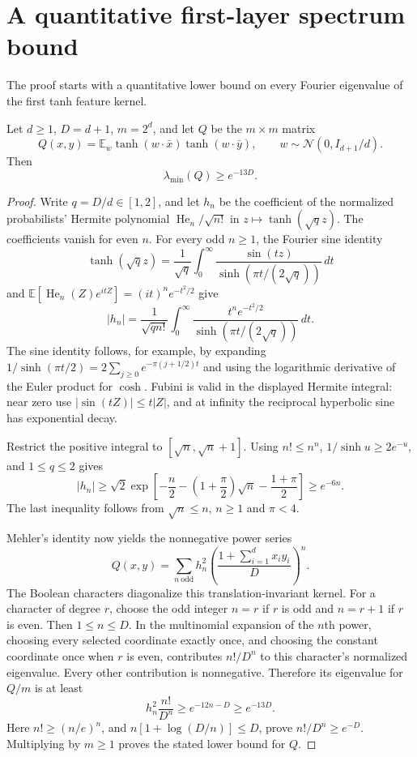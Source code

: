 \section{A quantitative first-layer spectrum bound}
\label{sec:critical-first-spectrum}

The proof starts with a quantitative lower bound on every Fourier
eigenvalue of the first tanh feature kernel.

\begin{lemma}
\label{lem:first-tanh-spectrum}
Let $d\ge1$, $D=d+1$, $m=2^d$, and let $Q$ be the $m\times m$ matrix
\[
 Q(x,y)=\mathbb E_w\tanh(w\cdot\bar x)\tanh(w\cdot\bar y),
 \qquad w\sim\mathcal N(0,I_{d+1}/d).
\]
Then
\[
 \lambda_{\min}(Q)\ge e^{-13D}.
\]
\end{lemma}

\begin{proof}
Write $q=D/d\in[1,2]$, and let $h_n$ be the coefficient of the
normalized probabilists' Hermite polynomial $\operatorname{He}_n/\sqrt{n!}$
in $z\mapsto\tanh(\sqrt q z)$. The coefficients vanish for even $n$.
For every odd $n\ge1$, the Fourier sine identity
\[
 \tanh(\sqrt q z)=\frac1{\sqrt q}\int_0^\infty
       \frac{\sin(tz)}{\sinh(\pi t/(2\sqrt q))}\,dt
\]
and $\mathbb E[\operatorname{He}_n(Z)e^{itZ}]=(it)^ne^{-t^2/2}$ give
\[
 |h_n|=\frac1{\sqrt{q n!}}\int_0^\infty
       \frac{t^ne^{-t^2/2}}{\sinh(\pi t/(2\sqrt q))}\,dt.
\]
The sine identity follows, for example, by expanding
$1/\sinh(\pi t/2)=2\sum_{j\ge0}e^{-\pi(j+1/2)t}$ and using the
logarithmic derivative of the Euler product for $\cosh$.
Fubini is valid in the displayed Hermite integral: near zero use
$|\sin(tZ)|\le t|Z|$, and at infinity the reciprocal hyperbolic sine
has exponential decay.

Restrict the positive integral to $[\sqrt n,\sqrt n+1]$.
Using $n!\le n^n$, $1/\sinh u\ge2e^{-u}$, and $1\le q\le2$ gives
\[
 |h_n|\ge\sqrt2\exp\left[-\frac n2
               -\left(1+\frac\pi2\right)\sqrt n
               -\frac{1+\pi}{2}\right]\ge e^{-6n}.
\]
The last inequality follows from $\sqrt n\le n$, $n\ge1$ and $\pi<4$.

Mehler's identity now yields the nonnegative power series
\[
 Q(x,y)=\sum_{n\ \mathrm{odd}}h_n^2
       \left(\frac{1+\sum_{i=1}^d x_i y_i}{D}\right)^n.
\]
The Boolean characters diagonalize this translation-invariant kernel.
For a character of degree $r$, choose the odd integer $n=r$ if $r$
is odd and $n=r+1$ if $r$ is even. Then $1\le n\le D$.
In the multinomial expansion of the $n$th power, choosing every
selected coordinate exactly once, and choosing the constant coordinate
once when $r$ is even, contributes $n!/D^n$ to this character's
normalized eigenvalue. Every other contribution is nonnegative.
Therefore its eigenvalue for $Q/m$ is at least
\[
 h_n^2\frac{n!}{D^n}\ge e^{-12n-D}\ge e^{-13D}.
\]
Here $n!\ge(n/e)^n$, and
$n[1+\log(D/n)]\le D$, prove $n!/D^n\ge e^{-D}$.
Multiplying by $m\ge1$ proves the stated lower bound for $Q$.
\end{proof}

